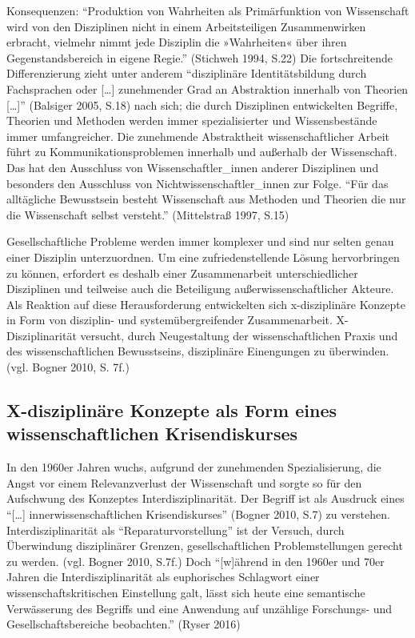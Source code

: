 \documentclass[a4paper,
fontsize=11pt,
oneside,
numbers=noperiodatend,
parskip=half-,
bibliography=totoc,
final
]{scrartcl}
\begin{document}
Konsequenzen: \enquote{Produktion von Wahrheiten als Primärfunktion von
Wissenschaft wird von den Disziplinen nicht in einem Arbeitsteiligen
Zusammenwirken erbracht, vielmehr nimmt jede Disziplin die »Wahrheiten«
über ihren Gegenstandsbereich in eigene Regie.} (Stichweh 1994, S.22)
Die fortschreitende Differenzierung zieht unter anderem
\enquote{disziplinäre Identitätsbildung durch Fachsprachen oder
{[}\ldots{}{]} zunehmender Grad an Abstraktion innerhalb von Theorien
{[}\ldots{}{]}} (Balsiger 2005, S.18) nach sich; die durch Disziplinen
entwickelten Begriffe, Theorien und Methoden werden immer
spezialisierter und Wissensbestände immer umfangreicher. Die zunehmende
Abstraktheit wissenschaftlicher Arbeit führt zu Kommunikationsproblemen
innerhalb und außerhalb der Wissenschaft. Das hat den Ausschluss von
Wissenschaftler\_innen anderer Disziplinen und besonders den Ausschluss
von Nichtwissenschaftler\_innen zur Folge. \enquote{Für das alltägliche
Bewusstsein besteht Wissenschaft aus Methoden und Theorien die nur die
Wissenschaft selbst versteht.} (Mittelstraß 1997, S.15)

Gesellschaftliche Probleme werden immer komplexer und sind nur selten
genau einer Disziplin unterzuordnen. Um eine zufriedenstellende Lösung
hervorbringen zu können, erfordert es deshalb einer Zusammenarbeit
unterschiedlicher Disziplinen und teilweise auch die Beteiligung
außerwissenschaftlicher Akteure. Als Reaktion auf diese Herausforderung
entwickelten sich x-disziplinäre Konzepte in Form von disziplin- und
systemübergreifender Zusammenarbeit. X-Disziplinarität versucht, durch
Neugestaltung der wissenschaftlichen Praxis und des wissenschaftlichen
Bewusstseins, disziplinäre Einengungen zu überwinden. (vgl. Bogner 2010,
S. 7f.)

\subsection*{X-disziplinäre Konzepte als Form eines wissenschaftlichen
Krisendiskurses}\label{x-disziplinuxe4re-konzepte-als-form-eines-wissenschaftlichen-krisendiskurses}

In den 1960er Jahren wuchs, aufgrund der zunehmenden Spezialisierung,
die Angst vor einem Relevanzverlust der Wissenschaft und sorgte so für
den Aufschwung des Konzeptes Interdisziplinarität. Der Begriff ist als
Ausdruck eines \enquote{{[}\ldots{}{]} innerwissenschaftlichen
Krisendiskurses} (Bogner 2010, S.7) zu verstehen. Interdisziplinarität
als \enquote{Reparaturvorstellung} ist der Versuch, durch Überwindung
disziplinärer Grenzen, gesellschaftlichen Problemstellungen gerecht zu
werden. (vgl. Bogner 2010, S.7f.) Doch \enquote{{[}w{]}ährend in den
1960er und 70er Jahren die Interdisziplinarität als euphorisches
Schlagwort einer wissenschaftskritischen Einstellung galt, lässt sich
heute eine semantische Verwässerung des Begriffs und eine Anwendung auf
unzählige Forschungs- und Gesellschaftsbereiche beobachten.} (Ryser
2016)
\end{document}
